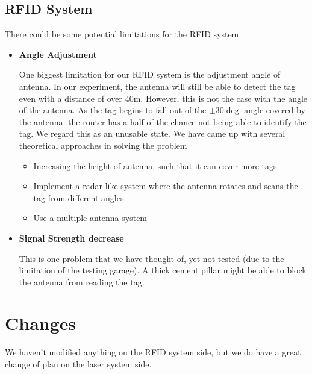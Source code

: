 \documentclass[12pt, a4paper]{article}
\begin{document}
\subsection{RFID System}
There could be some potential limitations for the RFID system
\begin{itemize}
	\item \textbf{Angle Adjustment}
	
	One biggest limitation for our RFID system is the adjustment angle of antenna. In our experiment, the antenna will still be able to detect the tag even with a distance of over 40m. However, this is not the case with the angle of the antenna. As the tag begins to fall out of the $\pm30\deg$ angle covered by the antenna. the router has a half of the chance not being able to identify the tag. We regard this as an unusable state. We have came up with several theoretical approaches in solving the problem
	\begin{itemize}
		\item Increasing the height of antenna, such that it can cover more tags
		\item Implement a radar like system where the antenna rotates and scans the tag from different angles.
		\item Use a multiple antenna system
	\end{itemize}
	\item \textbf{Signal Strength decrease}
	
	This is one problem that we have thought of, yet not tested (due to the limitation of the testing garage). A thick cement pillar might be able to block the antenna from reading the tag.
\end{itemize}
\section{Changes}
We haven't modified anything on the RFID system side, but we do have a great change of plan on the laser system side.
\end{document}
